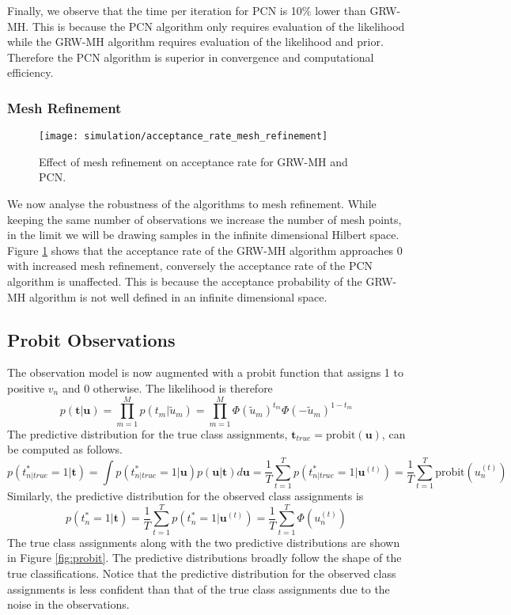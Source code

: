 \documentclass[11pt]{article}
\begin{document}
Finally, we observe that the time per iteration for PCN is 10\% lower than GRW-MH. This is because the PCN algorithm only requires evaluation of the likelihood while the GRW-MH algorithm requires evaluation of the likelihood and prior. Therefore the PCN algorithm is superior in convergence and computational efficiency.

\subsubsection{Mesh Refinement}
\begin{figure}
    \centering
    \texttt{[image: simulation/acceptance\_rate\_mesh\_refinement]}
    \caption{Effect of mesh refinement on acceptance rate for GRW-MH and PCN.}
    \label{fig:mesh_refinement}
\end{figure}

We now analyse the robustness of the algorithms to mesh refinement. While keeping the same number of observations we increase the number of mesh points, in the limit we will be drawing samples in the infinite dimensional Hilbert space. Figure \ref{fig:mesh_refinement} shows that the acceptance rate of the GRW-MH algorithm approaches 0 with increased mesh refinement, conversely the acceptance rate of the PCN algorithm is unaffected. This is because the acceptance probability of the GRW-MH algorithm is not well defined in an infinite dimensional space.

\subsection{Probit Observations}
The observation model is now augmented with a probit function that assigns 1 to positive $v_n$ and 0 otherwise. The likelihood is therefore
\begin{equation}
    p(\boldsymbol{t} | \boldsymbol{u}) = \prod_{m=1}^{M} p(t_m | \tilde{u}_m) = \prod_{m=1}^{M} \Phi(\tilde{u}_m)^{t_m} \Phi(-\tilde{u}_m)^{1-t_m}
\end{equation}
The predictive distribution for the true class assignments, $\boldsymbol{t}_{true} = \text{probit}(\boldsymbol{u})$, can be computed as follows.
\begin{equation}
    p(t_{n|true}^*=1|\boldsymbol{t}) = \int p(t_{n|true}^*=1 | \boldsymbol{u}) p(\boldsymbol{u} | \boldsymbol{t}) d\boldsymbol{u} = \frac{1}{T} \sum_{t=1}^{T} p(t_{n|true}^*=1 | \boldsymbol{u}^{(t)}) = \frac{1}{T} \sum_{t=1}^{T} \text{probit}(u^{(t)}_n)
\end{equation}
Similarly, the predictive distribution for the observed class assignments is
\begin{equation}
    p(t_{n}^*=1|\boldsymbol{t}) = \frac{1}{T} \sum_{t=1}^{T} p(t_{n}^*=1 | \boldsymbol{u}^{(t)}) = \frac{1}{T} \sum_{t=1}^{T} \Phi(u^{(t)}_n)
\end{equation}
The true class assignments along with the two predictive distributions are shown in Figure \ref{fig:probit}. The predictive distributions broadly follow the shape of the true classifications. Notice that the predictive distribution for the observed class assignments is less confident than that of the true class assignments due to the noise in the observations.
\end{document}
